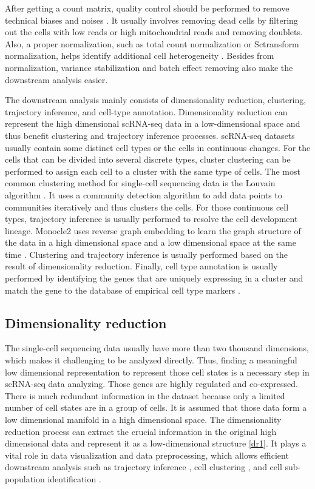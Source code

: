 After getting a count matrix, quality control should be performed to remove technical biases and noises \cite{van2017single}. It usually involves removing dead cells by filtering out the cells with low reads or high mitochondrial reads and removing doublets. Also, a proper normalization, such as total count normalization or Sctransform normalization, helps identify additional cell heterogeneity \cite{vallejos2017normalizing}. Besides from normalization, variance stabilization and batch effect removing also make the downstream analysis easier.

The downstream analysis mainly consists of dimensionality reduction, clustering, trajectory inference, and cell-type annotation. Dimensionality reduction can represent the high dimensional scRNA-seq data in a low-dimensional space and thus benefit clustering and trajectory inference processes. scRNA-seq datasets usually contain some distinct cell types or the cells in continuous changes. For the cells that can be divided into several discrete types, cluster clustering can be performed to assign each cell to a cluster with the same type of cells. The most common clustering method for single-cell sequencing data is the Louvain algorithm \cite{traag2019louvain}. It uses a community detection algorithm to add data points to communities iteratively and thus clusters the cells. For those continuous cell types, trajectory inference is usually performed to resolve the cell development lineage. Monocle2 uses reverse graph embedding to learn the graph structure of the data in a high dimensional space and a low dimensional space at the same time \cite{qiu2017reversed}. Clustering and trajectory inference is usually performed based on the result of dimensionality reduction. Finally, cell type annotation is usually performed by identifying the genes that are uniquely expressing in a cluster and match the gene to the database of empirical cell type markers \cite{abdelaal2019comparison}. 

\subsection{Dimensionality reduction}

The single-cell sequencing data usually have more than two thousand dimensions, which makes it challenging to be analyzed directly. Thus, finding a meaningful low dimensional representation to represent those cell states is a necessary step in scRNA-seq data analyzing. Those genes are highly regulated and co-expressed. There is much redundant information in the dataset because only a limited number of cell states are in a group of cells. It is assumed that those data form a low dimensional manifold in a high dimensional space. The dimensionality reduction process can extract the crucial information in the original high dimensional data and represent it as a low-dimensional structure \ref{dr1}.  It plays a vital role in data visualization and data preprocessing, which allows efficient downstream analysis such as trajectory inference \cite{Saelens2019}, cell clustering \cite{weber2016comparison}, and cell sub-population identification \cite{Hwang2018}. 

